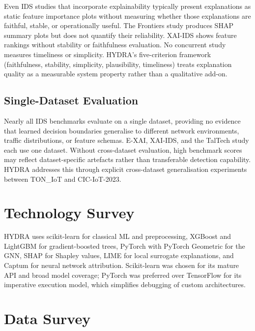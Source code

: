 \documentclass[12pt,a4paper]{report}
\begin{document}
Even IDS studies that incorporate explainability typically present explanations as static feature importance plots without measuring whether those explanations are faithful, stable, or operationally useful. The Frontiers study \cite{mohale2025} produces SHAP summary plots but does not quantify their reliability. XAI-IDS \cite{arreche2024b} shows feature rankings without stability or faithfulness evaluation. No concurrent study measures timeliness or simplicity. HYDRA's five-criterion framework (faithfulness, stability, simplicity, plausibility, timeliness) treats explanation quality as a measurable system property rather than a qualitative add-on.

\subsection{Single-Dataset Evaluation}
\label{sec:single-dataset-gap}

Nearly all IDS benchmarks evaluate on a single dataset, providing no evidence that learned decision boundaries generalise to different network environments, traffic distributions, or feature schemas. E-XAI, XAI-IDS, and the TalTech study each use one dataset. Without cross-dataset evaluation, high benchmark scores may reflect dataset-specific artefacts rather than transferable detection capability. HYDRA addresses this through explicit cross-dataset generalisation experiments between TON\_IoT and CIC-IoT-2023.

\section{Technology Survey}
\label{sec:techsurvey}

HYDRA uses scikit-learn \cite{pedregosa2011} for classical ML and preprocessing, XGBoost \cite{chen2016} and LightGBM \cite{ke2017} for gradient-boosted trees, PyTorch \cite{paszke2019} with PyTorch Geometric \cite{fey2019} for the GNN, SHAP \cite{lundberg2023} for Shapley values, LIME for local surrogate explanations, and Captum for neural network attribution. Scikit-learn was chosen for its mature API and broad model coverage; PyTorch was preferred over TensorFlow for its imperative execution model, which simplifies debugging of custom architectures.

\section{Data Survey}
\label{sec:datasurvey}
\end{document}
